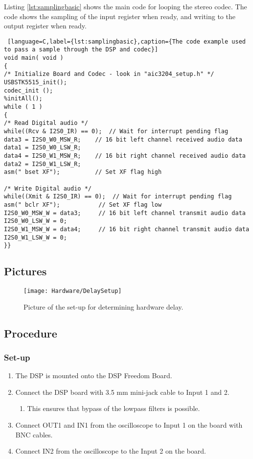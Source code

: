 Listing \ref{lst:samplingbasic} shows the main code for looping the stereo codec. The code shows the sampling of the input register when ready, and writing to the output register when ready. 

\begin{lstlisting} [language=C,label={lst:samplingbasic},caption={The code example used to pass a sample through the DSP and codec}]
void main( void )
{
/* Initialize Board and Codec - look in "aic3204_setup.h" */
USBSTK5515_init();
codec_init ();
%initAll();
while ( 1 )
{
/* Read Digital audio */
while((Rcv & I2S0_IR) == 0);  // Wait for interrupt pending flag
data3 = I2S0_W0_MSW_R;    // 16 bit left channel received audio data
data1 = I2S0_W0_LSW_R;
data4 = I2S0_W1_MSW_R;    // 16 bit right channel received audio data
data2 = I2S0_W1_LSW_R;
asm(" bset XF");	  	  // Set XF flag high

/* Write Digital audio */
while((Xmit & I2S0_IR) == 0);  // Wait for interrupt pending flag
asm(" bclr XF");		   // Set XF flag low
I2S0_W0_MSW_W = data3;     // 16 bit left channel transmit audio data
I2S0_W0_LSW_W = 0;
I2S0_W1_MSW_W = data4;     // 16 bit right channel transmit audio data
I2S0_W1_LSW_W = 0;
}}
\end{lstlisting}


\subsection{Pictures}

\begin{figure}[H]
	\centering
\texttt{[image: Hardware/DelaySetup]}
	\caption{Picture of the set-up for determining hardware delay.}
	\label{fig:DelayExperimentSetup}
\end{figure}

\subsection{Procedure}
\subsubsection{Set-up}
\begin{enumerate}
	\item The DSP is mounted onto the DSP Freedom Board.
	\item  Connect the DSP board with 3.5 mm mini-jack cable to Input 1 and 2.
	\begin{enumerate}
		\item This ensures that bypass of the lowpass filters is possible.
	\end{enumerate}
	\item Connect OUT1 and IN1 from the oscilloscope to Input 1 on the board with BNC cables.
	\item Connect IN2 from the oscilloscope to the Input 2 on the board.
\end{enumerate}

